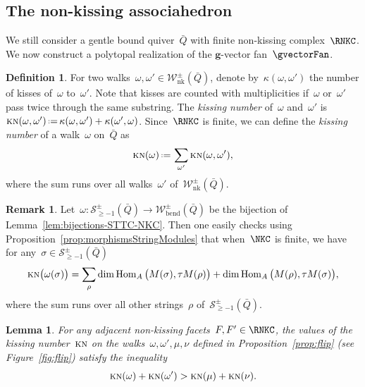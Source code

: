 \documentclass{amsart}
\newtheorem{lemma}[theorem]{Lemma}
\theoremstyle{definition}
\newtheorem{definition}[theorem]{Definition}
\newtheorem{remark}[theorem]{Remark}
\renewcommand{\b}[1]{\mathbf{#1}} %
\newcommand{\eqdef}{\mbox{\,\raisebox{0.2ex}{\scriptsize\ensuremath{\mathrm:}}\ensuremath{=}\,}} %
\newcommand{\fref}[1]{Figure~\ref{#1}} %
\newcommand{\ie}{\textit{i.e.}~} %
\newcommand{\darkblue}{\color{darkblue}} %
\newcommand{\defn}[1]{\textsl{\darkblue #1}} %
\newcommand{\strings}{\mathcal{S}} %
\newcommand{\bendingWalks}{\mathcal{W}_\mathrm{bend}} %
\newcommand{\NKWalks}{\mathcal{W}_\mathrm{nk}} %
\newcommand{\kn}{\kappa} %
\newcommand{\KN}{\textsc{kn}} %
\newcommand{\Hom}[1]{\operatorname{{\rm Hom}}_{#1}}
\begin{document}
\subsection{The non-kissing associahedron}
\label{subsec:associahedron}

We still consider a gentle bound quiver~$\bar Q$ with finite non-kissing complex~$\RNKC$.
We now construct a polytopal realization of the $\b{g}$-vector fan~$\gvectorFan$.

\begin{definition}\label{def: kissing number}
For two walks~$\omega, \omega' \in \NKWalks^\pm(\bar Q)$, denote by~$\kn(\omega,\omega')$ the number of kisses of~$\omega$ to~$\omega'$.
Note that kisses are counted with multiplicities if~$\omega$ or~$\omega'$ pass twice through the same substring.
The \defn{kissing number} of~$\omega$ and~$\omega'$ is~$\KN(\omega,\omega') \eqdef \kn(\omega,\omega') + \kn(\omega',\omega)$.
Since~$\RNKC$ is finite, we can define the \defn{kissing number} of a walk~$\omega$ on~$\bar Q$ as
\[
\KN(\omega) \eqdef \sum_{\omega'} \KN(\omega,\omega'),
\]
where the sum runs over all walks~$\omega'$ of~$\NKWalks^\pm(\bar Q)$.
\end{definition}

\begin{remark}\label{rem:KNvsTau}
Let~$\omega : \strings_{\ge -1}^\pm(\bar Q) \to \bendingWalks^\pm(\bar Q)$ be the bijection of Lemma~\ref{lem:bijections-STTC-NKC}.
Then one easily checks using Proposition~\ref{prop:morphismsStringModules} that when~$\NKC$ is finite, we have for any~$\sigma \in \strings_{\ge -1}^\pm(\bar Q)$
\[
\KN \big( \omega(\sigma) \big) = \sum_{\rho} \dim \Hom{A} \big( M(\sigma), \tau M(\rho) \big) + \dim \Hom{A} \big( M(\rho), \tau M(\sigma) \big),
\]
where the sum runs over all other strings~$\rho$ of~$\strings_{\ge -1}^\pm(\bar Q)$.
\end{remark}

\begin{lemma}
\label{lem:submodular}
For any adjacent non-kissing facets~$F,F' \in \RNKC$, the values of the kissing number~$\KN$ on the walks~$\omega, \omega', \mu, \nu$ defined in Proposition~\ref{prop:flip} (see \fref{fig:flip}) satisfy the inequality
\[
\KN(\omega) + \KN(\omega') > \KN(\mu) + \KN(\nu).
\]
\end{lemma}
\end{document}
